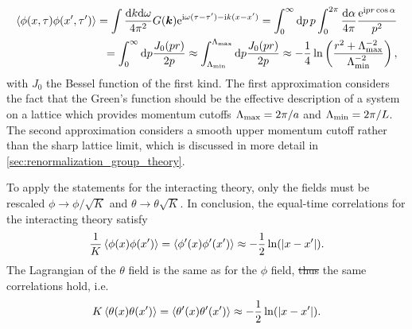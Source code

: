 \documentclass{svmono}
\def\ri{\mathrm i}
\def\re{\mathrm e}
\def\rd{\mathrm d}
\newcommand{\brlr}[1]{\left( #1 \right)}
\providecommand{\DIFdeltex}[1]{{\protect\color{red}\sout{#1}}}                      %
\providecommand{\DIFaddbegin}{} %
\providecommand{\DIFaddend}{} %
\providecommand{\DIFdelbegin}{} %
\providecommand{\DIFdelend}{} %
\providecommand{\DIFdel}[1]{\texorpdfstring{\DIFdeltex{#1}}{}} %
\newcommand{\DIFscaledelfig}{0.5}
\newlength{\DIFdelgraphicswidth} %
\newlength{\DIFdelgraphicsheight} %
\newcommand{\DIFaddincludegraphics}[2][]{{\color{blue}\fbox{\DIFOincludegraphics[#1]{#2}}}} %
\newcommand{\DIFdelincludegraphics}[2][]{%
\sbox{\DIFdelgraphicsbox}{\DIFOincludegraphics[#1]{#2}}%
\settoboxwidth{\DIFdelgraphicswidth}{\DIFdelgraphicsbox} %
\settoboxtotalheight{\DIFdelgraphicsheight}{\DIFdelgraphicsbox} %
\scalebox{\DIFscaledelfig}{%
\parbox[b]{\DIFdelgraphicswidth}{\usebox{\DIFdelgraphicsbox}\\[-\baselineskip] \rule{\DIFdelgraphicswidth}{0em}}\llap{\resizebox{\DIFdelgraphicswidth}{\DIFdelgraphicsheight}{%
\setlength{\unitlength}{\DIFdelgraphicswidth}%
\begin{picture}(1,1)%
\thicklines\linethickness{2pt} %
{\color[rgb]{1,0,0}\put(0,0){\framebox(1,1){}}}%
{\color[rgb]{1,0,0}\put(0,0){\line( 1,1){1}}}%
{\color[rgb]{1,0,0}\put(0,1){\line(1,-1){1}}}%
\end{picture}%
}\hspace*{3pt}}} %
} %
\DeclareRobustCommand{\DIFaddbegin}{\DIFOaddbegin \let\includegraphics\DIFaddincludegraphics} %
\DeclareRobustCommand{\DIFaddend}{\DIFOaddend \let\includegraphics\DIFOincludegraphics} %
\DeclareRobustCommand{\DIFdelbegin}{\DIFOdelbegin \let\includegraphics\DIFdelincludegraphics} %
\DeclareRobustCommand{\DIFdelend}{\DIFOaddend \let\includegraphics\DIFOincludegraphics} %
\begin{document}
\DIFdelend \DIFaddbegin \begin{align}
    \braket{\phi(x,\tau)\phi(x',\tau')}
    = \int\frac{\rd k\rd\omega}{4\pi^2}G({\bm k})\re^{\ri\omega(\tau-\tau')-\ri k(x-x')}
    = \int_0^\infty\rd p\, p\int_0^{2\pi}\frac{\rd\alpha}{4\pi}\frac{\re^{\ri pr\cos\alpha}}{p^2}
    \\
    = \int_0^\infty\rd p\frac{J_0(pr)}{2p}
    \approx
    \int_{\Lambda_{\rm min}}^{\Lambda_{\rm max}}\rd p \frac{J_0(pr)}{2p}
    \approx
    -\frac14\ln\brlr{\frac{r^2+\Lambda_{\rm max}^{-2}}{\Lambda_{\rm min}^{-2}}},
    \label{eq:kg_correlations_approximation}
\end{align}\DIFaddend 
with $J_0$ the Bessel function of the first kind.
The first approximation considers the fact that the Green's function should be the effective description of a system on a lattice which provides momentum cutoffs $\Lambda_{\rm max} = 2\pi/a$ and $\Lambda_{\rm min} = 2\pi/L$.
The second approximation considers a smooth upper momentum cutoff rather than the sharp lattice limit, which is discussed in more detail in \cref{sec:renormalization_group_theory}.

To apply the statements for the interacting theory, only the fields must be rescaled $\phi\rightarrow\phi/\sqrt K$ and $\theta\rightarrow\theta\sqrt K$.
In conclusion, the equal-time correlations for the interacting theory satisfy
\DIFdelbegin %
\DIFdelend \DIFaddbegin \begin{align}
    \frac1K\braket{\phi(x)\phi(x')} = \braket{\phi'(x)\phi'(x')} \approx -\frac12\ln(|x-x'|).
    \label{eq:greens_1}
\end{align}\DIFaddend 
The Lagrangian of the $\theta$ field is the same as for the $\phi$ field, \DIFdelbegin \DIFdel{thus }\DIFdelend the same correlations hold, i.e.
\DIFdelbegin %
\DIFdelend \DIFaddbegin \begin{align}
    K\braket{\theta(x)\theta(x')} = \braket{\theta'(x)\theta'(x')} \approx -\frac12\ln(|x-x'|).
    \label{eq:greens_2}
\end{align}\DIFaddend 
\end{document}

